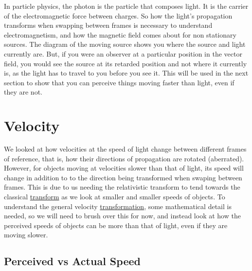 In particle physics, the photon is the particle that composes light.
It is the carrier of the electromagnetic force between charges.
So how the light's propagation transforms when swapping between frames is necessary to understand electromagnetism, and how the magnetic field comes about for non stationary sources.
The diagram of the moving source shows you where the source and light currently are.
But, if you were an observer at a particular position in the vector field, you would see the source at its retarded position and not where it currently is, as the light has to travel to you before you see it.
This will be used in the next section to show that you can perceive things moving faster than light, even if they are not.


\section{Velocity} \label{sect: (intro) Velocity}

We looked at how velocities at the speed of light change between different frames of reference, that is, how their directions of propagation are rotated (aberrated).
However, for objects moving at velocities slower than that of light, its speed will change in addition to to the direction being transformed when swaping between frames.
This is due to us needing the relativistic transform to tend towards the classical \hyperlink{def-transform}{transform} as we look at smaller and smaller speeds of objects.
To understand the general velocity \hyperlink{def-transform}{transformation}, some mathematical detail is needed, so we will need to brush over this for now, and instead look at how the perceived speeds of objects can be more than that of light, even if they are moving slower.

\subsection{Perceived vs Actual Speed} \label{subsect: Perceived vs Actual Speed}

